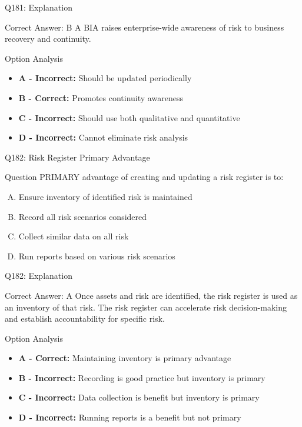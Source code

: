 \documentclass{beamer}
\begin{document}
	\begin{frame}{Q181: Explanation}
		\begin{block}{Correct Answer: B}
			A BIA raises enterprise-wide awareness of risk to business recovery and continuity.
		\end{block}
		\begin{block}{Option Analysis}
			\begin{itemize}
				\item \textbf{A - Incorrect:} Should be updated periodically
				\item \textbf{B - Correct:} Promotes continuity awareness
				\item \textbf{C - Incorrect:} Should use both qualitative and quantitative
				\item \textbf{D - Incorrect:} Cannot eliminate risk analysis
			\end{itemize}
		\end{block}
	\end{frame}
	
	\begin{frame}{Q182: Risk Register Primary Advantage}
		\begin{block}{Question}
			PRIMARY advantage of creating and updating a risk register is to:
		\end{block}
		\begin{enumerate}[(A)]
			\item Ensure inventory of identified risk is maintained
			\item Record all risk scenarios considered
			\item Collect similar data on all risk
			\item Run reports based on various risk scenarios
		\end{enumerate}
	\end{frame}
	
	\begin{frame}{Q182: Explanation}
		\begin{block}{Correct Answer: A}
			Once assets and risk are identified, the risk register is used as an inventory of that risk. The risk register can accelerate risk decision-making and establish accountability for specific risk.
		\end{block}
		\begin{block}{Option Analysis}
			\begin{itemize}
				\item \textbf{A - Correct:} Maintaining inventory is primary advantage
				\item \textbf{B - Incorrect:} Recording is good practice but inventory is primary
				\item \textbf{C - Incorrect:} Data collection is benefit but inventory is primary
				\item \textbf{D - Incorrect:} Running reports is a benefit but not primary
			\end{itemize}
		\end{block}
	\end{frame}
	
\end{document}
